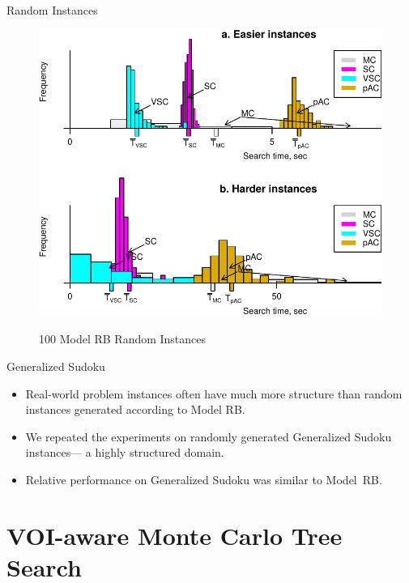 \documentclass{beamer}
\begin{document}
\begin{frame}{Random Instances}
\begin{figure}[h] 
\centering
\includegraphics[scale=0.6]{random-problems-arrows+legend.pdf}

100 Model RB Random Instances
\end{figure}
\end{frame}

\begin{frame}{Generalized Sudoku}
\begin{itemize}
\item Real-world problem instances often have much more structure
  than random instances generated according to Model RB.
\item We repeated the
  experiments on randomly generated Generalized Sudoku instances---
  a highly structured domain.
\item Relative performance on Generalized Sudoku was similar to
  Model~RB.
\end{itemize}
\end{frame}

\section{VOI-aware Monte Carlo Tree Search}
\end{document}
